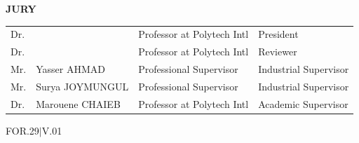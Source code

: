 \begin{titlepage}
\vspace{0.6cm}
{\sffamily\bfseries\large JURY \par}
\vspace{0.25cm}

{\small
\begin{tabular}{@{}p{}p{}p{}p{}@{}}
Dr. & \dotfill{} & Professor at Polytech Intl & President \\[4pt]
Dr. & \dotfill{} & Professor at Polytech Intl & Reviewer \\[4pt]
Mr. & Yasser AHMAD & Professional Supervisor & Industrial Supervisor \\[4pt]
Mr. & Surya JOYMUNGUL & Professional Supervisor & Industrial Supervisor \\[4pt]
Dr. & Marouene CHAIEB & Professor at Polytech Intl & Academic Supervisor \\
\end{tabular}\par}

\vfill
\noindent
\begin{minipage}[b]{0.5\textwidth}
  \raggedright {\footnotesize FOR.29$|$V.01}
\end{minipage}
\begin{minipage}[b]{0.5\textwidth}
\end{minipage}

\end{titlepage}
